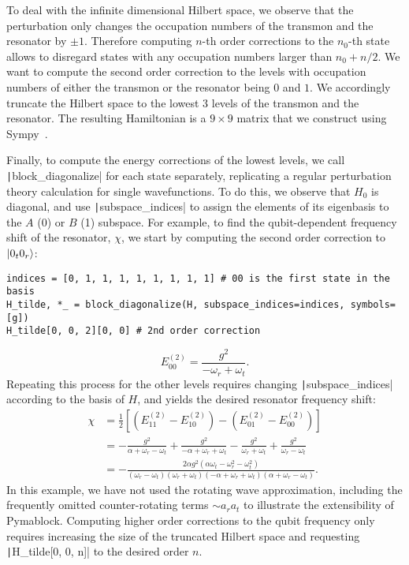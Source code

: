To deal with the infinite dimensional Hilbert space, we observe that the perturbation only changes the occupation numbers of the transmon and the resonator by $\pm 1$.
Therefore computing $n$-th order corrections to the $n_0$-th state allows to disregard states with any occupation numbers larger than $n_0 + n/2$.
We want to compute the second order correction to the levels with occupation numbers of either the transmon or the resonator being $0$ and $1$.
We accordingly truncate the Hilbert space to the lowest 3 levels of the transmon and the resonator.
The resulting Hamiltonian is a $9 \times 9$ matrix that we construct using Sympy~\cite{Meurer_2017}.

Finally, to compute the energy corrections of the lowest levels, we call \texttt|block_diagonalize| for each state separately, replicating a regular perturbation theory calculation for single wavefunctions.
To do this, we observe that $H_0$ is diagonal, and use \texttt|subspace_indices| to assign the elements of its eigenbasis to the $A$ (0) or $B$ (1) subspace.
For example, to find the qubit-dependent frequency shift of the resonator, $\chi$, we start by computing the second order correction to $\ket{0_{t}0_{r}}$:
%
\begin{verbatim}
indices = [0, 1, 1, 1, 1, 1, 1, 1, 1] # 00 is the first state in the basis
H_tilde, *_ = block_diagonalize(H, subspace_indices=indices, symbols=[g])
H_tilde[0, 0, 2][0, 0] # 2nd order correction
\end{verbatim}
%
\begin{equation}
    E^{(2)}_{00} = \frac{g^{2}}{-\omega_{r} + \omega_{t}}.
\end{equation}
%
Repeating this process for the other levels requires changing \texttt|subspace_indices| according to the basis of $H$, and yields the desired resonator frequency shift:
%
\begin{equation}
\begin{aligned}
\chi &= \frac{1}{2}\left[(E^{(2)}_{11} - E^{(2)}_{10}) - (E^{(2)}_{01} - E^{(2)}_{00})\right] \\
& = - \frac{g^{2}}{\alpha + \omega_{r} - \omega_{t}} + \frac{g^{2}}{- \alpha + \omega_{r} + \omega_{t}} - \frac{g^{2}}{\omega_{r} + \omega_{t}} + \frac{g^{2}}{\omega_{r} - \omega_{t}} \\
& = - \frac{2 \alpha g^{2} \left(\alpha \omega_{t} - \omega_{r}^{2} - \omega_{t}^{2}\right)}{\left(\omega_{r} - \omega_{t}\right) \left(\omega_{r} + \omega_{t}\right) \left(- \alpha + \omega_{r} + \omega_{t}\right) \left(\alpha + \omega_{r} - \omega_{t}\right)}.
\end{aligned}
\end{equation}
%
In this example, we have not used the rotating wave approximation, including the frequently omitted counter-rotating terms $\sim a_{r} a_{t}$ to illustrate the extensibility of Pymablock.
Computing higher order corrections to the qubit frequency only requires increasing the size of the truncated Hilbert space and requesting \texttt|H_tilde[0, 0, n]| to the desired order $n$.

